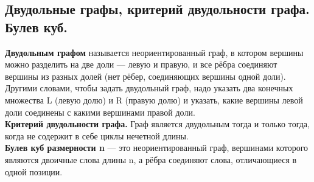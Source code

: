 \subsection{Двудольные графы, критерий двудольности графа. Булев куб.}


\textbf{Двудольным графом} называется неориентированный граф, в котором вершины можно разделить на две доли — левую и правую, и все рёбра соединяют вершины из разных долей (нет рёбер, соединяющих вершины одной доли). Другими словами, чтобы задать двудольный граф, надо указать два конечных множества L (левую долю) и R (правую долю) и указать, какие вершины левой доли соединены с какими вершинами правой доли. \\

\textbf{Критерий двудольности графа.} Граф является двудольным тогда и только тогда, когда не содержит в себе циклы нечетной длины. \\


\textbf{Булев куб размерности n} — это неориентированный граф, вершинами которого являются двоичные слова длины n, а рёбра соединяют слова, отличающиеся в одной позиции.